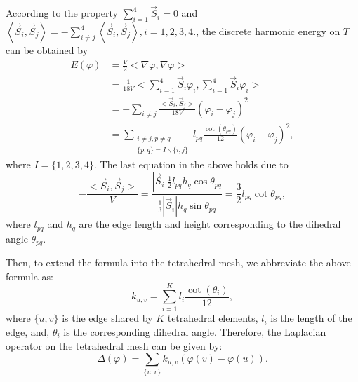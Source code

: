 \documentclass{article}
\begin{document}
According to the property $\sum^{4}_{i = 1}\vec{S}_i = 0$ and $\left<\vec{S}_i,\vec{S}_j \right> = - \sum^{4}_{i \neq j}\left<\vec{S}_i,\vec{S}_j \right>, i = 1,2,3,4.$, the discrete harmonic energy on $T$ can be obtained by 
\begin{equation}
\begin{aligned}
E(\varphi) & =\frac{V}{2}<\nabla \varphi, \nabla \varphi>\\
&=\frac{1}{18 V}<\sum_{i=1}^4 \vec{S}_i \varphi_i, \sum_{i=1}^4 \vec{S}_i \varphi_i> \\
& =-\sum_{i \neq j} \frac{<\vec{S}_i, \vec{S}_j>}{18 V}\left(\varphi_i-\varphi_j\right)^2 \\
& =\sum_{\substack{i \neq j, p \neq q \\
\{p, q\}=I \backslash\{i, j\}}} l_{p q} \frac{\cot \left(\theta_{p q}\right)}{12}\left(\varphi_i-\varphi_j\right)^2 ,
\end{aligned}
\end{equation}
where $I = \{1,2,3,4 \}$. The last equation in the above holds due to
\begin{equation}
    -\frac{<\vec{S}_i, \vec{S}_j>}{V} = \frac{|\vec{S}_i|\frac{1}{2}l_{pq}h_q \cos{\theta_{pq}}}{\frac{1}{3}|\vec{S}_i|h_q\sin{\theta_{pq}}} = \frac{3}{2}l_{pq}\cot{\theta_{pq}},
\end{equation}
where $l_{pq}$ and $h_q$ are the edge length and height corresponding to the dihedral angle $\theta_{pq}$.

Then, to extend the formula into the tetrahedral mesh, we abbreviate the above formula as:
\begin{equation}\label{eqt:k_i_j}
    k_{u,v} = \sum_{i = 1}^{K} l_{i} \frac{\cot \left(\theta_{i}\right)}{12},
\end{equation}
where $\{ u,v\}$ is the edge shared by $K$ tetrahedral elements, $l_i$ is the length of the edge, and, $\theta_i$ is the corresponding dihedral angle. 
Therefore, the Laplacian operator on the tetrahedral mesh can be given by:
\begin{equation}\label{eqt:laplace_discrete}
    \Delta(\varphi) = \sum_{\{u,v \} }k_{u,v}\left(\varphi(v) - \varphi(u) \right).
\end{equation}
\end{document}
